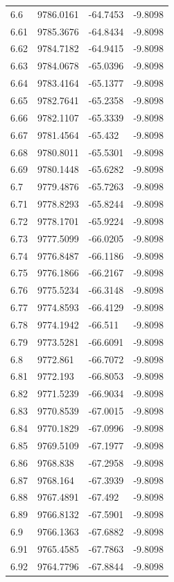 \begin{table}[H]
\begin{tabular}{llll}
6.6 & 9786.0161 & -64.7453 & -9.8098 \\
6.61 & 9785.3676 & -64.8434 & -9.8098 \\
6.62 & 9784.7182 & -64.9415 & -9.8098 \\
6.63 & 9784.0678 & -65.0396 & -9.8098 \\
6.64 & 9783.4164 & -65.1377 & -9.8098 \\
6.65 & 9782.7641 & -65.2358 & -9.8098 \\
6.66 & 9782.1107 & -65.3339 & -9.8098 \\
6.67 & 9781.4564 & -65.432 & -9.8098 \\
6.68 & 9780.8011 & -65.5301 & -9.8098 \\
6.69 & 9780.1448 & -65.6282 & -9.8098 \\
6.7 & 9779.4876 & -65.7263 & -9.8098 \\
6.71 & 9778.8293 & -65.8244 & -9.8098 \\
6.72 & 9778.1701 & -65.9224 & -9.8098 \\
6.73 & 9777.5099 & -66.0205 & -9.8098 \\
6.74 & 9776.8487 & -66.1186 & -9.8098 \\
6.75 & 9776.1866 & -66.2167 & -9.8098 \\
6.76 & 9775.5234 & -66.3148 & -9.8098 \\
6.77 & 9774.8593 & -66.4129 & -9.8098 \\
6.78 & 9774.1942 & -66.511 & -9.8098 \\
6.79 & 9773.5281 & -66.6091 & -9.8098 \\
6.8 & 9772.861 & -66.7072 & -9.8098 \\
6.81 & 9772.193 & -66.8053 & -9.8098 \\
6.82 & 9771.5239 & -66.9034 & -9.8098 \\
6.83 & 9770.8539 & -67.0015 & -9.8098 \\
6.84 & 9770.1829 & -67.0996 & -9.8098 \\
6.85 & 9769.5109 & -67.1977 & -9.8098 \\
6.86 & 9768.838 & -67.2958 & -9.8098 \\
6.87 & 9768.164 & -67.3939 & -9.8098 \\
6.88 & 9767.4891 & -67.492 & -9.8098 \\
6.89 & 9766.8132 & -67.5901 & -9.8098 \\
6.9 & 9766.1363 & -67.6882 & -9.8098 \\
6.91 & 9765.4585 & -67.7863 & -9.8098 \\
6.92 & 9764.7796 & -67.8844 & -9.8098 \\

\end{tabular}
\end{table}
